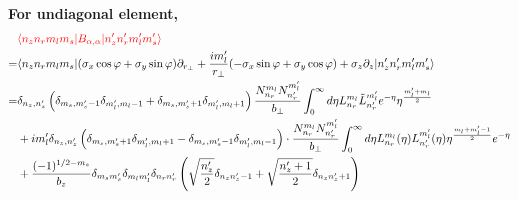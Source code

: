   \textbf{For undiagonal element,}
  \begin{equation}
    \begin{aligned}
      &\textcolor{red}{\langle n_z n_r m_l m_s | B_{\alpha, \alpha} | n_z^{\prime} n_r^{\prime} m_l^{\prime} m_s^{\prime} \rangle}\\
      =& \langle n_z n_r m_l m_s | (\sigma_x \cos\varphi + \sigma_{y}\sin\varphi)\partial_{r_{\perp}} + \frac{im_l^{\prime}}{r_{\perp}}(-\sigma_x\sin\varphi + \sigma_y\cos\varphi) + \sigma_z\partial_z | n_z^{\prime} n_r^{\prime} m_l^{\prime} m_s^{\prime} \rangle  \\
      =& \delta_{n_z,n_z^{\prime}} \left( \delta_{m_s,m_s^{\prime}-1} \delta_{m_{l}^{\prime},m_{l}-1} + \delta_{m_s,m_s^{\prime}+1} \delta _{m_{l}^{\prime},m_{l}+1} \right) \frac{N_{n_r}^{m_l} N_{n_r^{\prime}}^{m_l^{\prime}}}{b_{\perp}} \int_{0}^{\infty} d\eta L_{n_r}^{m_l}\tilde{L}_{n_r^\prime}^{m_l^\prime} e^{-\eta} \eta^{\frac{m_{l}^{\prime} + m_l}{2}} \\
      &+ i m_l^\prime \delta_{n_z,n_z^\prime} \left(\delta_{m_s,m_s^{\prime}+1} \delta_{m_{l}^{\prime},m_{l}+1} - \delta_{m_s,m_s^{\prime}-1} \delta_{m_{l}^{\prime},m_{l}-1} \right) \cdot \frac{N_{n_r}^{m_l} N_{n_r^{\prime}}^{m_l^{\prime}}}{b_{\perp}} \int_{0}^{\infty} d\eta L_{n_r}^{m_l}(\eta) L_{n_r^\prime}^{m_l^\prime}(\eta) \eta^{\frac{m_l + m_l^\prime - 1}{2}} e^{-\eta}\\
      &+ \frac{(-1)^{1 / 2-m_{s}}}{b_{z}} \delta_{m_{s} m_{s}^{\prime}} \delta_{m_{l} m_{l}^{\prime}} \delta_{n_{r} n_{r}^{\prime}}\left(\sqrt{\frac{n_{z}^{\prime}}{2}} \delta_{n_{z} n_{z}^{\prime}-1}+\sqrt{\frac{n_{z}^{\prime}+1}{2}} \delta_{n_{z} n_{z}^{\prime}+1}\right) \label{oc_undiagonal}
    \end{aligned}
  \end{equation}
